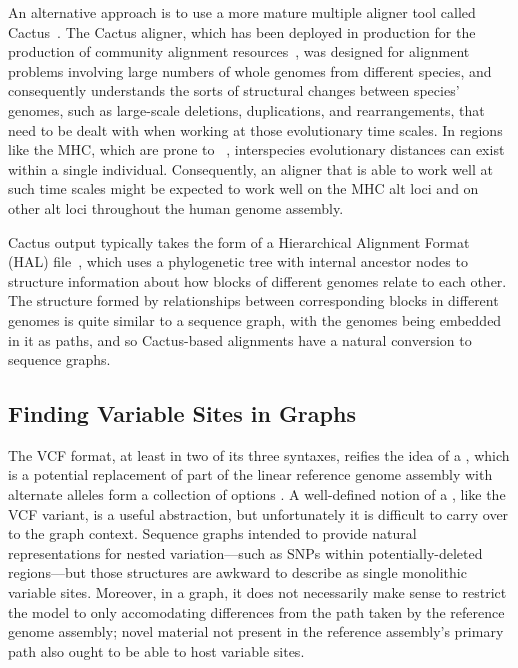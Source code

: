 An alternative approach is to use a more mature multiple aligner tool called Cactus~\cite{paten2011cactus2}. The Cactus aligner, which has been deployed in production for the production of community alignment resources~\cite{howe2015wormbase}, was designed for alignment problems involving large numbers of whole genomes from different species, and consequently understands the sorts of structural changes between species' genomes, such as large-scale deletions, duplications, and rearrangements, that need to be dealt with when working at those evolutionary time scales. In regions like the MHC, which are prone to ~\cite{prufer2012bonobo}, interspecies evolutionary distances can exist within a single individual. Consequently, an aligner that is able to work well at such time scales might be expected to work well on the MHC alt loci and on other alt loci throughout the human genome assembly.

Cactus output typically takes the form of a Hierarchical Alignment Format (HAL) file~\cite{hickey2013hal,howe2015wormbase}, which uses a phylogenetic tree with internal ancestor nodes to structure information about how blocks of different genomes relate to each other. The structure formed by relationships between corresponding blocks in different genomes is quite similar to a sequence graph, with the genomes being embedded in it as paths, and so Cactus-based alignments have a natural conversion to sequence graphs.

\subsection{Finding Variable Sites in Graphs}

The VCF format, at least in two of its three syntaxes, reifies the idea of a , which is a potential replacement of part of the linear reference genome assembly with alternate alleles form a collection of options \cite{marshall2013variant}. A well-defined notion of a , like the VCF variant, is a useful abstraction, but unfortunately it is difficult to carry over to the graph context. Sequence graphs intended to provide natural representations for nested variation---such as SNPs within potentially-deleted regions---but those structures are awkward to describe as single monolithic variable sites. Moreover, in a graph, it does not necessarily make sense to restrict the model to only accomodating differences from the path taken by the reference genome assembly; novel material not present in the reference assembly's primary path also ought to be able to host variable sites.

